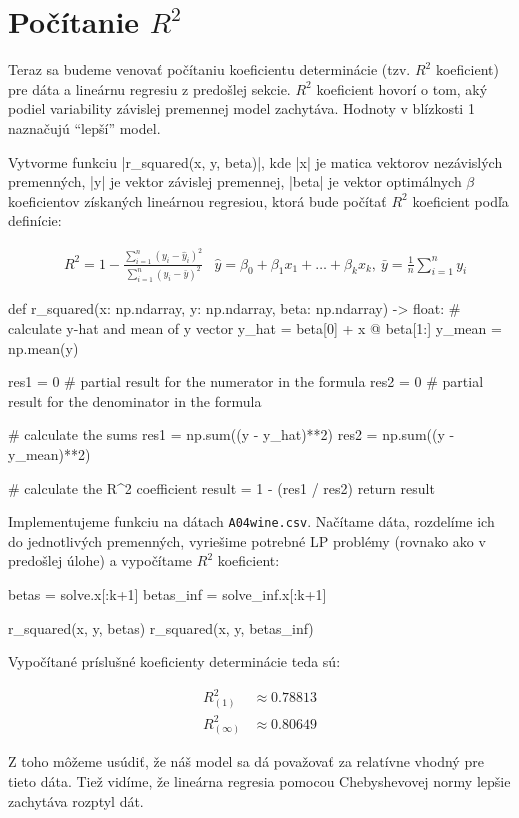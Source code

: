 \documentclass[report.tex]{subfiles}
\begin{document}
   

\section{Počítanie $R^2$}\label{sec:D}
Teraz sa budeme venovať počítaniu koeficientu determinácie (tzv. $R^2$ koeficient) pre dáta a lineárnu regresiu z predošlej sekcie. $R^2$ koeficient hovorí o tom, aký podiel variability závislej premennej model zachytáva. Hodnoty v blízkosti 1 naznačujú \enquote{lepší} model.

Vytvorme funkciu \pyth|r_squared(x, y, beta)|, kde \pyth|x| je matica vektorov nezávislých premenných, \pyth|y| je vektor závislej premennej, \pyth|beta| je vektor optimálnych $\beta$ koeficientov získaných lineárnou regresiou, ktorá bude počítať $R^2$ koeficient podľa definície:

\begin{align*}
	&R^2 = 1 - \frac{\sum_{i=1}^{n} (y_i - \hat{y}_i)^2}{\sum_{i=1}^{n} (y_i - \bar{y})^2} &\hat{y} = \beta_0 + \beta_1x_1 + \dots + \beta_kx_k,~\bar{y} = \frac{1}{n} \sum_{i=1}^ny_i
\end{align*}

\begin{python}
def r_squared(x: np.ndarray, y: np.ndarray, beta: np.ndarray) -> float:
	# calculate y-hat and mean of y vector
	y_hat = beta[0] + x @ beta[1:]
	y_mean = np.mean(y)
	
	res1 = 0    # partial result for the numerator in the formula
	res2 = 0    # partial result for the denominator in the formula
	
	# calculate the sums
	res1 = np.sum((y - y_hat)**2)
	res2 = np.sum((y - y_mean)**2)
	
	# calculate the R^2 coefficient
	result = 1 - (res1 / res2)
	return result
\end{python}

Implementujeme funkciu na dátach \verb|A04wine.csv|. Načítame dáta, rozdelíme ich do jednotlivých premenných, vyriešime potrebné LP problémy (rovnako ako v predošlej úlohe) a vypočítame $R^2$ koeficient:

\begin{python}
	betas = solve.x[:k+1]
	betas_inf = solve_inf.x[:k+1]
	
	r_squared(x, y, betas)
	r_squared(x, y, betas_inf)
\end{python}
	
Vypočítané príslušné koeficienty determinácie teda sú:

\begin{align*}
	R^{2}_{(1)} &\approx  0.78813 \\
	R^{2}_{(\infty)} &\approx 0.80649
\end{align*}

Z toho môžeme usúdiť, že náš model sa dá považovať za relatívne vhodný pre tieto dáta. Tiež vidíme, že lineárna regresia pomocou Chebyshevovej normy lepšie zachytáva rozptyl dát.
\end{document}
